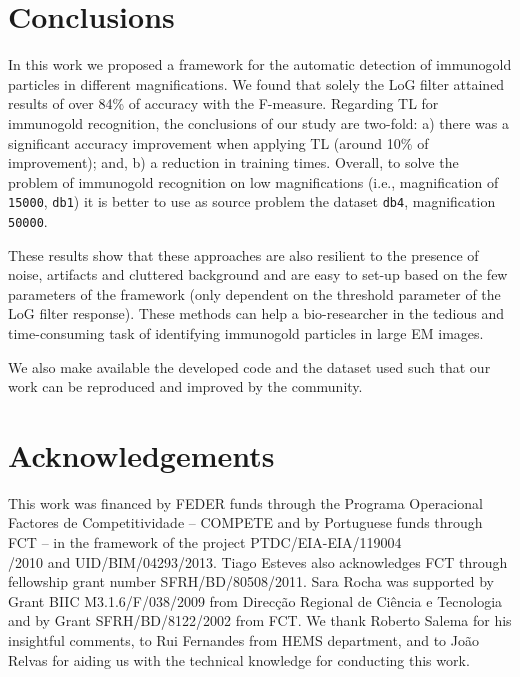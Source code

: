 \documentclass[a4paper,11pt]{article}
\newcommand{\1}{\mathbbm{1}}
\newcommand{\db}[1]{\texttt{#1}}
\theoremstyle{plain}
\begin{document}
\section{Conclusions}
\label{sec:conclusions}

In this work we proposed a framework for the automatic detection of immunogold particles in different magnifications. We found that solely the \ac{LoG} filter attained results of over 84\% of accuracy with the F-measure.
Regarding \ac{TL} for immunogold recognition, the conclusions of our study are two-fold: a) there was a significant accuracy improvement when applying \ac{TL} (around 10\% of improvement); and, b) a reduction in training times. Overall, to solve the problem of immunogold recognition on low magnifications (i.e., magnification of \db{15000}, \db{db1}) it is better to use as source problem the dataset \db{db4}, magnification \db{50000}.

These results show that these approaches are also resilient to the presence of noise, artifacts and cluttered background and are easy to set-up based on the few parameters of the framework (only dependent on the threshold parameter of the \ac{LoG} filter response).
These methods can help a bio-researcher in the tedious and time-consuming task of identifying immunogold particles in large EM images.

We also make available the developed code and the dataset used such that our work can be reproduced and improved by the community.


\section{Acknowledgements}
This work was financed by FEDER funds through the Programa Operacional Factores de Competitividade – COMPETE and by Portuguese funds through FCT – in the framework of the project PTDC/EIA-EIA/119004\\/2010 and UID/BIM/04293/2013.
Tiago Esteves also acknowledges FCT through fellowship grant number SFRH/BD/80508/2011.
Sara Rocha was supported by Grant BIIC M3.1.6/F/038/2009 from Direcção Regional de Ciência e Tecnologia and by Grant SFRH/BD/8122/2002 from FCT.
We thank Roberto Salema for his insightful comments, to Rui Fernandes from HEMS department, and to João Relvas for aiding us with the technical knowledge for conducting this work.
% 
\end{document}
